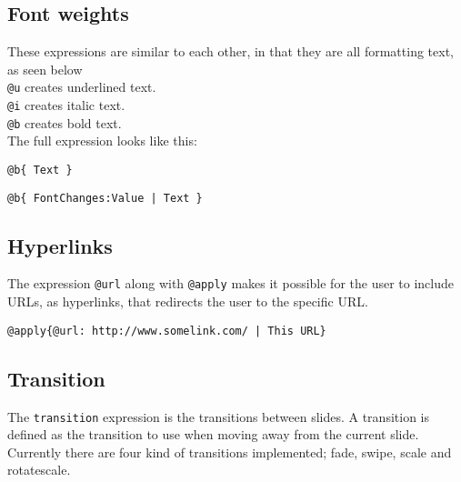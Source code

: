 \subsection{Font weights}
These expressions are similar to each other, in that they are all formatting text, as seen below \\

\texttt{@u} creates underlined text. \\
\texttt{@i} creates italic text. \\
\texttt{@b} creates bold text. \\
The full expression looks like this:
\begin{lstlisting}[frame=single]
@b{ Text }
\end{lstlisting}


\begin{lstlisting}[frame=single]
@b{ FontChanges:Value | Text }
\end{lstlisting}



\subsection{Hyperlinks}
The expression \texttt{@url} along with \texttt{@apply} makes it possible for the user to include URLs, as hyperlinks, that redirects the user to the specific URL.

\begin{lstlisting}[frame=single]
	@apply{@url: http://www.somelink.com/ | This URL}
\end{lstlisting}	

\subsection{Transition}
\label{transition}
The \texttt{transition} expression is the transitions between slides. A transition is defined as the transition to use when moving away from the current slide. Currently there are four kind of transitions implemented; fade, swipe, scale and rotatescale.

